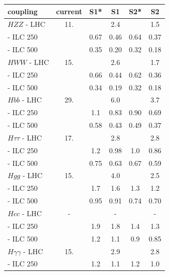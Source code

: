 \begin{table}[!htbp]
\begin{center}
\begin{tabular}{lccccc}
   coupling     &  current  &    S1*     &     S1     &    S2*   &   S2   \\ \hline 
$HZZ$ - LHC  &     11.      &        &       2.4  &        &  1.5 \\ 
\phantom{$HZZ$} - ILC 250 &      &   0.67  &  0.46   &   0.64   &  0.37 \\ 
\phantom{$HZZ$} - ILC 500&      &   0.35  &  0.20  &  0.32   & 0.18 \\ 
 \hline 
$HWW$ - LHC  &    15.       &        &    2.6    &        &  1.7 \\ 
\phantom{$HWW$} - ILC 250 &      &   0.66 &  0.44   &   0.62  &  0.36 \\ 
 \phantom{$HWW$} - ILC 500 &      &   0.34 &  0.19   &  0.32 & 0.18 \\ 
   \hline 
$Hbb$ - LHC  &    29.       &        &         6.0   &        & 3.7 \\ 
\phantom{$Hbb$} - ILC 250 &      &  1.1  & 0.83   &   0.90   &  0.69 \\ 
\phantom{$Hbb$} - ILC 500 &      &  0.58  & 0.43   &  0.49  &  0.37 \\ 
 \hline 
$H\tau\tau$ - LHC  &    17.       &        &             2.8  &        & 2.8 \\ 
\phantom{$H\tau\tau$} - ILC 250 &      &  1.2  &  0.98   &   1.0  &  0.86 \\ 
\phantom{$H\tau\tau$} - ILC 500 &      &  0.75  &  0.63   &  0.67   & 0.59 \\ 
    \hline 
$Hgg$ - LHC  &     15.      &        &            4.0   &        &
               2.5  \\ 
\phantom{$hgg$} - ILC 250 &      &  1.7  &  1.6   &   1.3   &  1.2 \\ 
 \phantom{$hgg$} - ILC 500 &      &  0.95  &  0.91   &  0.74  & 0.70 \\ 
\hline 
$Hcc$ - LHC  &    -       &        &           -  &        &  - \\ 
\phantom{$Hcc$} - ILC 250 &      &   1.9  &  1.8   &   1.4  &  1.3 \\ 
\phantom{$Hcc$} - ILC 500 &      &  1.2  &  1.1   &   0.9  &  0.85 \\ 
    \hline 
$H\gamma\gamma$ - LHC  &    15.       &        &        2.9  &        & 2.8 \\ 
\phantom{$H\gamma\gamma$} - ILC 250  &      &   1.2  &  1.1  &   1.2   &  1.0\\ 

\end{tabular}
\end{center}
\end{table}
